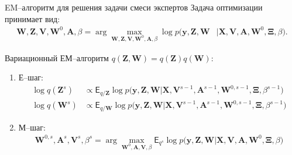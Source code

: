 \documentclass[9pt,pdf,hyperref={unicode}]{beamer}
\begin{document}
\begin{frame}{EM--алгоритм для решения задачи смеси экспертов}
\justifying
Задача оптимизации принимает вид:
\begin{equation*}
\begin{aligned}
\mathbf{W}, \mathbf{Z}, \mathbf{V}, \mathbf{W}^0, \textbf{A},  \beta = \arg\max_{\mathbf{W}, \mathbf{Z}, \mathbf{V}, \mathbf{W}^0, \textbf{A}, \beta} \log p\bigr(\mathbf{y}, \mathbf{Z}, \mathbf{W}&|\mathbf{X}, \mathbf{V}, \textbf{A}, \textbf{W}^{0}, \bm{\Xi}, \beta\bigr).
\end{aligned}
\end{equation*}

Вариационный ЕМ--алгоритм $q\left(\textbf{Z}, \textbf{W}\right) = q\left(\textbf{Z}\right)q\left(\textbf{W}\right)$:
	\begin{enumerate}
		\item Е--шаг: 
			\begin{equation*}
				\begin{aligned}
					\log q\left(\textbf{Z}^{s}\right) &\propto \mathsf{E}_{q/\textbf{Z}}\log p\bigr(\mathbf{y}, \textbf{Z},\mathbf{W}|\mathbf{X}, \mathbf{V}^{s-1}, \textbf{A}^{s-1}, \textbf{W}^{0, s-1}, \bm{\Xi}, \beta^{s-1}\bigr)\\
					\log q\left(\textbf{W}^{s}\right) &\propto \mathsf{E}_{q/\textbf{W}}\log p\bigr(\mathbf{y}, \textbf{Z},\mathbf{W}|\mathbf{X}, \mathbf{V}^{s-1}, \textbf{A}^{s-1}, \textbf{W}^{0, s-1}, \bm{\Xi}, \beta^{s-1}\bigr)
				\end{aligned}
			\end{equation*}
		\item М--шаг: 
			\begin{equation}
				\begin{aligned}
					\textbf{W}^{0, s}, \textbf{A}^{s}, \textbf{V}^{s}, \beta^{s} = \arg\max_{\textbf{W}^{0}, \textbf{A}, \textbf{V}, \beta} \mathsf{E}_{q^{s}}\log p\bigr(\mathbf{y}, \textbf{Z},\mathbf{W}|\mathbf{X}, \mathbf{V}, \textbf{A}, \textbf{W}^{0}, \bm{\Xi}, \beta\bigr)
				\end{aligned}
			\end{equation}
	\end{enumerate}
\end{frame}
\end{document}

